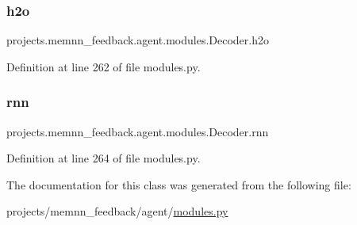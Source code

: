 \subsubsection{\texorpdfstring{h2o}{h2o}}
{\footnotesize\ttfamily projects.\+memnn\+\_\+feedback.\+agent.\+modules.\+Decoder.\+h2o}



Definition at line 262 of file modules.\+py.

\mbox{\label{classprojects_1_1memnn__feedback_1_1agent_1_1modules_1_1Decoder_a7cd6616d295ec8fc3ab0c837e651f402}} 
\subsubsection{\texorpdfstring{rnn}{rnn}}
{\footnotesize\ttfamily projects.\+memnn\+\_\+feedback.\+agent.\+modules.\+Decoder.\+rnn}



Definition at line 264 of file modules.\+py.



The documentation for this class was generated from the following file\+:\begin{DoxyCompactItemize}
\item 
projects/memnn\+\_\+feedback/agent/\hyperlink{projects_2memnn__feedback_2agent_2modules_8py}{modules.\+py}\end{DoxyCompactItemize}
